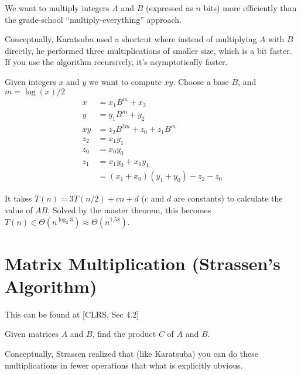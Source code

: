         We want to multiply integers $A$ and $B$ (expressed as $n$ bits)
        more efficiently than the grade-school ``multiply-everything'' approach.

        Conceptually, Karatsuba used a shortcut where instead of multiplying
        $A$ with $B$ directly, he performed three multiplications of smaller
        size, which is a bit faster. If you use the algorithm recursively, it's
        asymptotically faster.

        Given integers $x$ and $y$ we want to compute $xy$. Choose a base $B$,
        and $m = \log(x)/2$
        \begin{align*}
            x &= x_1 B^m + x_2 \\
            y &= y_1 B^m + y_2 \\
            xy &= z_2 B^{2m} + z_0 + z_1 B^{m} \\
            z_2 &= x_1 y_1 \\
            z_0 &= x_0 y_0 \\
            z_1 &= x_1 y_0 + x_0 y_1 \\
            &= (x_1 + x_0)(y_1 + y_0) - z_2 - z_0
        \end{align*}

        It takes $T(n) = 3 T(n/2) + cn + d$ ($c$ and $d$ are constants) to
        calculate the value of $AB$. Solved by the master theorem, this becomes
        $T(n) \in \Theta(n^{\log_2{3}}) \approx \Theta(n^1.58)$.

    \section{Matrix Multiplication (Strassen's Algorithm)}
        This can be found at [CLRS, Sec 4.2]

        Given matrices $A$ and $B$, find the product $C$ of $A$ and $B$.

        Conceptually, Strassen realized that (like Karatsuba) you can do these
        multiplications in fewer operations that what is explicitly obvious.

